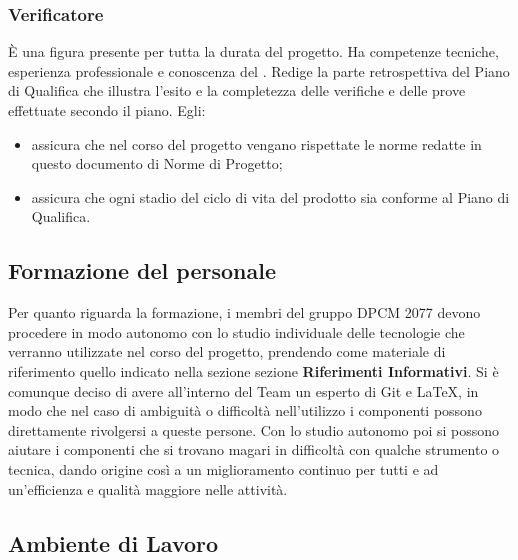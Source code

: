 \subsubsection{Verificatore}
È una figura presente per tutta la durata del progetto. Ha competenze tecniche, esperienza professionale e conoscenza del .	
Redige la parte retrospettiva del Piano di Qualifica che illustra l'esito e la completezza delle verifiche e delle prove effettuate secondo il piano.
Egli:
\begin{itemize}
\item{assicura che nel corso del progetto vengano rispettate le norme redatte in questo documento di Norme di Progetto;}
\item{assicura che ogni stadio del ciclo di vita del prodotto sia conforme al Piano di Qualifica.}
\end{itemize}


\subsection{Formazione del personale}
Per quanto riguarda la formazione, i membri del gruppo DPCM 2077 devono procedere in modo autonomo con lo studio individuale delle tecnologie che verranno utilizzate nel corso del progetto, prendendo come materiale di riferimento quello indicato nella sezione sezione \textbf{Riferimenti Informativi}. Si è comunque deciso di avere all'interno del Team un esperto di Git e {\LaTeX}, in modo che nel caso di ambiguità o difficoltà nell'utilizzo i componenti possono direttamente
rivolgersi a queste persone. Con lo studio autonomo poi si possono aiutare i componenti che si trovano magari in difficoltà con qualche strumento o tecnica, dando origine così a un miglioramento continuo per tutti e ad un'efficienza e qualità maggiore nelle attività. 



\subsection{Ambiente di Lavoro}

